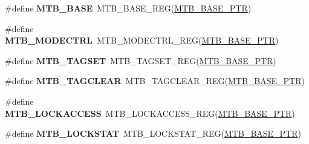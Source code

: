 \begin{DoxyCompactItemize}
\item 
\hypertarget{group___m_t_b___register___accessor___macros_ga64ea285c9775d03c2ab9d9194ad9c65c}{}\#define {\bfseries M\+T\+B\+\_\+\+B\+A\+S\+E}~M\+T\+B\+\_\+\+B\+A\+S\+E\+\_\+\+R\+E\+G(\hyperlink{group___m_t_b___peripheral_gadf7f362dfa67354951e6a23ddf08cd73}{M\+T\+B\+\_\+\+B\+A\+S\+E\+\_\+\+P\+T\+R})\label{group___m_t_b___register___accessor___macros_ga64ea285c9775d03c2ab9d9194ad9c65c}

\item 
\hypertarget{group___m_t_b___register___accessor___macros_ga00d4027aa9de57d1d216ae2331dfb623}{}\#define {\bfseries M\+T\+B\+\_\+\+M\+O\+D\+E\+C\+T\+R\+L}~M\+T\+B\+\_\+\+M\+O\+D\+E\+C\+T\+R\+L\+\_\+\+R\+E\+G(\hyperlink{group___m_t_b___peripheral_gadf7f362dfa67354951e6a23ddf08cd73}{M\+T\+B\+\_\+\+B\+A\+S\+E\+\_\+\+P\+T\+R})\label{group___m_t_b___register___accessor___macros_ga00d4027aa9de57d1d216ae2331dfb623}

\item 
\hypertarget{group___m_t_b___register___accessor___macros_gaddf096e99a94797b17c244a2edbe0a75}{}\#define {\bfseries M\+T\+B\+\_\+\+T\+A\+G\+S\+E\+T}~M\+T\+B\+\_\+\+T\+A\+G\+S\+E\+T\+\_\+\+R\+E\+G(\hyperlink{group___m_t_b___peripheral_gadf7f362dfa67354951e6a23ddf08cd73}{M\+T\+B\+\_\+\+B\+A\+S\+E\+\_\+\+P\+T\+R})\label{group___m_t_b___register___accessor___macros_gaddf096e99a94797b17c244a2edbe0a75}

\item 
\hypertarget{group___m_t_b___register___accessor___macros_gaf7137f4ceb5b43345e4ba212ecf2e6f0}{}\#define {\bfseries M\+T\+B\+\_\+\+T\+A\+G\+C\+L\+E\+A\+R}~M\+T\+B\+\_\+\+T\+A\+G\+C\+L\+E\+A\+R\+\_\+\+R\+E\+G(\hyperlink{group___m_t_b___peripheral_gadf7f362dfa67354951e6a23ddf08cd73}{M\+T\+B\+\_\+\+B\+A\+S\+E\+\_\+\+P\+T\+R})\label{group___m_t_b___register___accessor___macros_gaf7137f4ceb5b43345e4ba212ecf2e6f0}

\item 
\hypertarget{group___m_t_b___register___accessor___macros_ga78ad97fdc6b5752cf1a30731a0f8585b}{}\#define {\bfseries M\+T\+B\+\_\+\+L\+O\+C\+K\+A\+C\+C\+E\+S\+S}~M\+T\+B\+\_\+\+L\+O\+C\+K\+A\+C\+C\+E\+S\+S\+\_\+\+R\+E\+G(\hyperlink{group___m_t_b___peripheral_gadf7f362dfa67354951e6a23ddf08cd73}{M\+T\+B\+\_\+\+B\+A\+S\+E\+\_\+\+P\+T\+R})\label{group___m_t_b___register___accessor___macros_ga78ad97fdc6b5752cf1a30731a0f8585b}

\item 
\hypertarget{group___m_t_b___register___accessor___macros_gaebecb4529453581f85d19cacab9c0508}{}\#define {\bfseries M\+T\+B\+\_\+\+L\+O\+C\+K\+S\+T\+A\+T}~M\+T\+B\+\_\+\+L\+O\+C\+K\+S\+T\+A\+T\+\_\+\+R\+E\+G(\hyperlink{group___m_t_b___peripheral_gadf7f362dfa67354951e6a23ddf08cd73}{M\+T\+B\+\_\+\+B\+A\+S\+E\+\_\+\+P\+T\+R})\label{group___m_t_b___register___accessor___macros_gaebecb4529453581f85d19cacab9c0508}


\end{DoxyCompactItemize}
